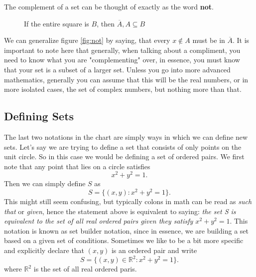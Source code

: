 \documentclass[11pt]{article}
\numberwithin{lemma}{section}
\numberwithin{equation}{section}
\numberwithin{define}{section}
\numberwithin{prop}{section}
\numberwithin{figure}{section}
\numberwithin{theorem}{section}
\newcounter{ex}[section]
\numberwithin{ex}{section}
\def\real{\mathbb{R}}
\begin{document}
The complement of a set can be thought of exactly as the word \textbf{not}.
\begin{figure}[h]
\centering
	\caption{If the entire square is $B$, then $\overline A, A\subseteq B$}
	\label{fig:not}
\end{figure}
We can generalize figure \eqref{fig:not} by saying, that every $x\notin  A$ must be in $\overline A$. It is important to note here that generally, when talking about a compliment, you need to know what you are "complementing" over, in essence, you must know that your set is a subset of a larger set. Unless you go into more advanced mathematics, generally you can assume that this will be the real numbers, or in more isolated cases, the set of complex numbers, but nothing more than that. 

\subsection{Defining Sets}
The last two notations in the chart are simply ways in which we can define new sets. Let's say we are trying to define a set that consists of only points on the unit circle. So in this case we would be defining a set of ordered pairs. We first note that any point that lies on a circle satisfies
$$x^2+y^2=1.$$
Then we can simply define $S$ as
$$S=\{(x,y) : x^2+y^2=1\}.$$
This might still seem confusing, but typically colons in math can be read as \textit{such that} or \textit{given}, hence the statement above is equivalent to saying: 
\textit{the set S is equivalent to the set of all real ordered pairs given they satisfy $x^2+y^2=1$}. 
This notation is known as set builder notation, since in essence, we are building a set based on a given set of conditions.
Sometimes we like to be a bit more specific and explicitly declare that $(x,y)$ is an ordered pair and write
$$S=\{(x,y)\in \real^2 : x^2+y^2=1\}.$$
where $\real^2$ is the set of all real ordered paris.
\end{document}
